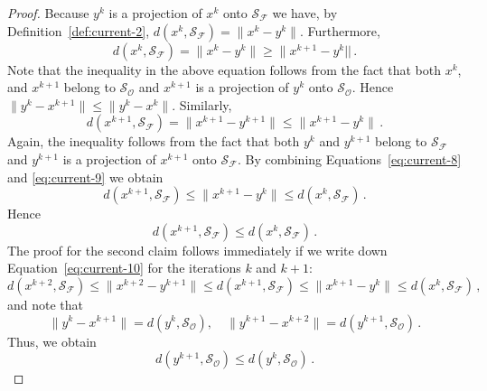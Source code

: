 \begin{proof}[Proof]
  Because $y^{k}$ is a projection of $x^{k}$ onto
  $\mathcal{S}_{\mathcal{F}}$ we have, by
  Definition~\ref{def:current-2},
  $d(x^{k}, \mathcal{S}_{\mathcal{F}})=\|x^{k}-y^{k}\|$. Furthermore,
  \begin{equation}
    \label{eq:current-8}
    d(x^{k}, \mathcal{S}_{\mathcal{F}}) = \|x^{k} - y^{k}\| \geq
    \|x^{k+1} - y^{k}||\,.  
  \end{equation}
  Note that the inequality in the above equation follows from the fact
  that both $x^{k}$, and $x^{k+1}$ belong to $\mathcal{S}_{\mathcal{O}}$
  and $x^{k+1}$ is a projection of $y^{k}$ onto
  $\mathcal{S}_\mathcal{O}$. Hence $\|y^{k}-x^{k+1}\| \leq
  \|y^{k}-x^{k}\|$. Similarly,
  \begin{equation}
    \label{eq:current-9}
    d(x^{k+1}, \mathcal{S}_{\mathcal{F}}) = \|x^{k+1} - y^{k+1}\| \leq
    \|x^{k+1} - y^{k}\|\,.  
  \end{equation}
  Again, the inequality follows from the fact that both $y^{k}$ and
  $y^{k+1}$ belong to $\mathcal{S}_{\mathcal{F}}$ and $y^{k+1}$ is a
  projection of $x^{k+1}$ onto $\mathcal{S}_{\mathcal{F}}$. By combining
  Equations~\eqref{eq:current-8} and \eqref{eq:current-9} we obtain
  \begin{equation}
    \label{eq:current-10}
    d(x^{k+1}, \mathcal{S}_{\mathcal{F}}) \leq  \|x^{k+1} - y^{k}\|
    \leq  d(x^{k}, \mathcal{S}_{\mathcal{F}})\,. 
  \end{equation}
  Hence
  \begin{equation}
    \label{eq:current-11}
     d(x^{k+1}, \mathcal{S}_{\mathcal{F}}) \leq  d(x^{k},
     \mathcal{S}_{\mathcal{F}})\,.
   \end{equation}
   The proof for the second claim follows immediately if we write down
   Equation~\eqref{eq:current-10} for the iterations $k$ and $k+1$:
   \begin{equation}
     \label{eq:current-12}
     d(x^{k+2}, \mathcal{S}_{\mathcal{F}})  \leq \|x^{k+2} - y^{k+1}\|
     \leq  d(x^{k+1}, \mathcal{S}_{\mathcal{F}}) \leq  \|x^{k+1} - y^{k}\|
     \leq  d(x^{k}, \mathcal{S}_{\mathcal{F}}) \,, 
   \end{equation}
   and note that
   \begin{equation}
     \label{eq:current-13}
     \|y^{k} - x^{k+1}\| = d(y^{k}, \mathcal{S}_{\mathcal{O}}),\quad
     \|y^{k+1} - x^{k+2}\| = d(y^{k+1}, \mathcal{S}_{\mathcal{O}})\,.
   \end{equation}
   Thus, we obtain
   \begin{equation}
     \label{eq:current-14}
     d(y^{k+1}, \mathcal{S}_{\mathcal{O}}) \leq d(y^{k},
     \mathcal{S}_{\mathcal{O}})\,.
   \end{equation}
\end{proof}
